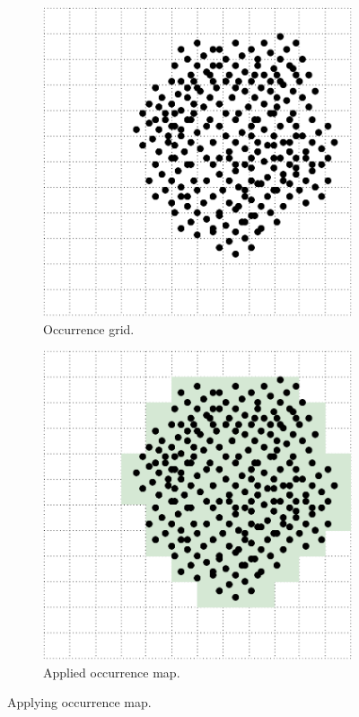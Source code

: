 \begin{figure}[ht]
\begin{subfigure}[t]{0.3\textwidth}
        \includegraphics[width=\textwidth]{occurrence-grid.pdf}
        \caption{Occurrence grid.}
    \end{subfigure}
    
    \begin{subfigure}[t]{0.4\textwidth}
        \includegraphics[width=\textwidth]{occurrence-map-applied.pdf}
        \caption{Applied occurrence map.}
    \end{subfigure}
    
    \caption{Applying occurrence map.}
    \label{fig:occurrence_map}
\end{figure}

